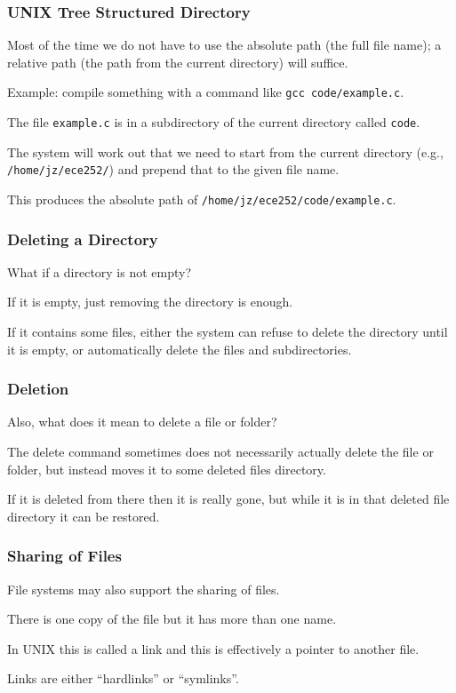 \begin{frame}
	\frametitle{UNIX Tree Structured Directory}

	Most of the time we do not have to use the absolute path (the full file name); a relative path (the path from the current directory) will suffice.

	Example: compile something with a command like \texttt{gcc code/example.c}.

	The file \texttt{example.c} is in a subdirectory of the current directory called \texttt{code}.

	The system will work out that we need to start from the current directory (e.g., \texttt{/home/jz/ece252/}) and prepend that to the given file name.

	This produces the absolute path of \texttt{/home/jz/ece252/code/example.c}.

\end{frame}



\begin{frame}
	\frametitle{Deleting a Directory}

	What if a directory is not empty?

	If it is empty, just removing the directory is enough.

	If it contains some files, either the system can refuse to delete the directory until it is empty, or automatically delete the files and subdirectories.

\end{frame}

\begin{frame}
	\frametitle{Deletion}

	Also, what does it mean to delete a file or folder?

	The delete command sometimes does not necessarily actually delete the file or folder, but instead moves it to some deleted files directory.

	If it is deleted from there then it is really gone, but while it is in that deleted file directory it can be restored.

\end{frame}

\begin{frame}
	\frametitle{Sharing of Files}

	File systems may also support the sharing of files.

	There is one copy of the file but it has more than one name.

	In UNIX this is called a \alert{link} and this is effectively a pointer to another file.

	Links are either ``hardlinks'' or ``symlinks''.

\end{frame}

